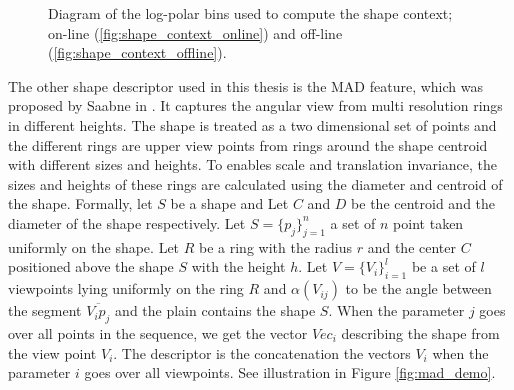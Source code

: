 \begin{figure}
\centering
{}
\caption{Diagram of the log-polar bins used to compute the shape context; on-line (\ref{fig:shape_context_online}) and off-line (\ref{fig:shape_context_offline}).}
\label{fig:shape_context_demo}
\end{figure}

\iftoggle{edit-mode}{\hspace{0pt}\marginpar{MAD}}{}
The other shape descriptor used in this thesis is the MAD feature, which was proposed by Saabne in \cite{saabni2013multi}. 
It captures the angular view from multi resolution rings in different heights. 
The shape is treated as a two dimensional set of points and the different rings are upper view points from rings around the shape centroid with different sizes and heights. 
To enables scale and translation invariance, the sizes and heights of these rings are calculated using the diameter and centroid of the shape.
Formally, let $S$ be a shape and Let $C$ and $D$ be the centroid and the diameter of the shape respectively. 
Let $S = \{p_j\}_{j = 1}^n$ a set of $n$ point taken uniformly on the shape. 
Let $R$ be a ring with the radius $r$ and the center $C$ positioned above the shape $S$ with the height $h$. 
Let $V = \{V_i\}_{i = 1}^l$ be a set of $l$ viewpoints lying uniformly on the ring $R$ and $\alpha(V_{ij})$ to be the angle between the segment $\overline {{V_i}{p_j}}$ and the plain contains the shape $S$. 
When the parameter $j$ goes over all points in the sequence, we get the vector $Vec_i$ describing the shape from the view point $V_i$.
The descriptor is the concatenation the vectors $V_i$ when the parameter $i$ goes over all viewpoints. 
See illustration in Figure \ref{fig:mad_demo}.

